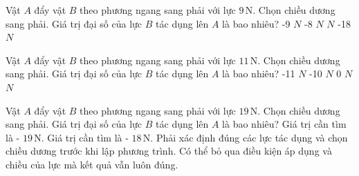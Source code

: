\begin{ex}
Vật $A$ đẩy vật $B$ theo phương ngang sang phải với lực $9\,\text{N}$. Chọn chiều dương sang phải. Giá trị đại số của lực $B$ tác dụng lên $A$ là bao nhiêu?
\choice
{-9 $N$}
{-8 $N$}
{ $N$}
{-18 $N$}
\end{ex}

\begin{ex}
Vật $A$ đẩy vật $B$ theo phương ngang sang phải với lực $11\,\text{N}$. Chọn chiều dương sang phải. Giá trị đại số của lực $B$ tác dụng lên $A$ là bao nhiêu?
\choice
{-11 $N$}
{-10 $N$}
{0 $N$}
{ $N$}
\end{ex}

\begin{ex}
Vật $A$ đẩy vật $B$ theo phương ngang sang phải với lực $19\,\text{N}$. Chọn chiều dương sang phải. Giá trị đại số của lực $B$ tác dụng lên $A$ là bao nhiêu?
\choiceTF
{\True Giá trị cần tìm là - $19\,\text{N}$.}
{Giá trị cần tìm là - $18\,\text{N}$.}
{\True Phải xác định đúng các lực tác dụng và chọn chiều dương trước khi lập phương trình.}
{Có thể bỏ qua điều kiện áp dụng và chiều của lực mà kết quả vẫn luôn đúng.}
\end{ex}

